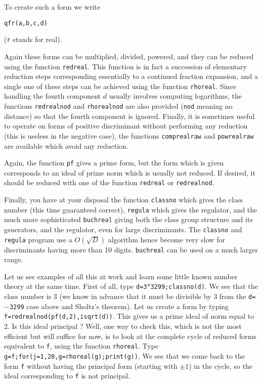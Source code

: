 To create such a form we write

\centerline{\tt qfr(a,b,c,d)}

({\tt r} stands for real).

Again these forms can be multiplied, divided, powered, and they can be reduced
using the function {\tt redreal}. This function is in fact a succession of
elementary reduction steps corresponding essentially to a continued fraction
expansion, and a single one of these steps can be achieved using the function
{\tt rhoreal}. Since handling the fourth component $d$ usually
involves computing logarithms, the functions {\tt redrealnod} and 
{\tt rhorealnod} are also provided ({\tt nod} meaning no distance) so that the
fourth component is ignored. Finally, it is sometimes useful to operate on
forms of positive discriminant without performing any reduction (this is
useless in the negative case), the functions {\tt comprealraw} and 
{\tt powrealraw} are available which avoid any reduction.

Again, the function {\tt pf} gives a prime form, but the form which is given
corresponds to an ideal of prime norm which is usually not reduced. If
desired, it should be reduced with one of the function {\tt redreal} or
{\tt redrealnod}.

Finally, you have at your disposal the function {\tt classno} which gives
the class number (this time guaranteed correct), {\tt regula} which gives
the regulator, and the much more sophisticated {\tt buchreal} giving both
the class group structure and its generators, and the regulator, even for
large discriminants.
The {\tt classno} and {\tt regula} program use a $O(\sqrt D)$ algorithm
hence become very slow for discriminants having more than 10 digits. 
{\tt buchreal} can be used on a much larger range.

Let us see examples of all this at work and learn some little known
number theory at the same time. First of all, type {\tt d=3$*$3299;classno(d)}.
We see that the class number is 3 (we know in advance that it must be
divisible by 3 from the {\tt d=$-$3299} case above and Sholtz's theorem).
Let us create a form
by typing {\tt f=redrealnod(pf(d,2),isqrt(d))}. This gives us a prime ideal
of norm equal to 2. Is this ideal principal ? Well, one way to check this,
which is not the most efficient but will suffice for now, is to look at
the complete cycle of reduced forms equivalent to {\tt f}, using the
function {\tt rhoreal}. Type {\tt g=f;for(j=1,20,g=rhoreal(g);print(g))}.
We see that we come back to the form {\tt f} without having the principal
form (starting with $\pm1$) in the cycle, so the ideal corresponding to
{\tt f} is not principal. 

